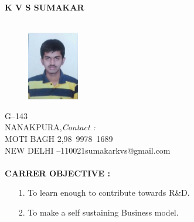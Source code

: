 \documentclass{article}
\begin{document}
	\begin{center}
		\textbf{K V S SUMAKAR}\\
		\hrulefill\\
		
	\end{center}
	\begin{figure}[h]
		\centering
	\includegraphics[width=0.2\textwidth]{IMG-20160524-WA0002}
	
	\end{figure}
	G--143\\ 
	NANAKPURA,\hfill \textsl{Contact :}\\
	MOTI BAGH 2,\hfill \mbox{98 9978 1689}\\
	NEW DELHI --\mbox{110021}\hfill \mbox{sumakarkvs@gmail.com}\\
	\\
	
	\textbf{CARRER OBJECTIVE :}
	\begin{itemize}
\item[1.] 	To learn enough to contribute towards R\&D.
\item[2.]	To make a self sustaining Business model.
	\end{itemize}
	
	
	
	
\end{document}
